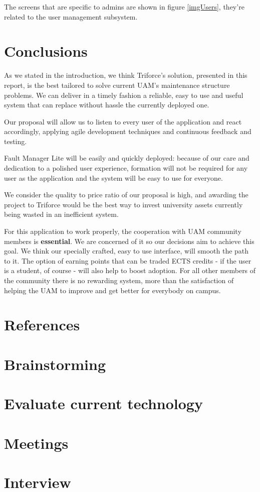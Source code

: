 \documentclass{report}
\begin{document}
The screens that are specific to admins are shown in figure \ref{imgUsers}, they're related to the user management subsystem.

\chapter{Conclusions}
\label{chapConclusions}

As we stated in the introduction, we think Triforce's solution, presented in this report, is the best tailored to solve current UAM's maintenance structure problems. We can deliver in a timely fashion a reliable, easy to use and useful system that can replace without hassle the currently deployed one.

Our proposal will allow us to listen to every user of the application and react accordingly, applying agile development techniques and continuous feedback and testing.

Fault Manager Lite will be easily and quickly deployed: because of our care and dedication to a polished user experience, formation will not be required for any user as the application and the system will be easy to use for everyone.

We consider the quality to price ratio of our proposal is high, and awarding the project to Triforce would be the best way to invest university assets currently being wasted in an inefficient system.

For this application to work properly, the cooperation with UAM community members is \textbf{essential}. We are concerned of it so our decisions aim to achieve this goal. We think our specially crafted, easy to use interface, will smooth the path to it. The option of earning points that can be traded ECTS credits - if the user is a student, of course - will also help to boost adoption. For all other members of the community there is no rewarding system, more than the satisfaction of helping the UAM to improve and get better for everybody on campus.

\chapter{References}
\label{references}



\appendix

\chapter{Brainstorming}
\label{chapBrainstorming}



\chapter{Evaluate current technology}
\label{chapCurrentTechnology}


\chapter{Meetings}
\label{chapMeetings}


\chapter{Interview}
\label{chapInterview}

\end{document}
